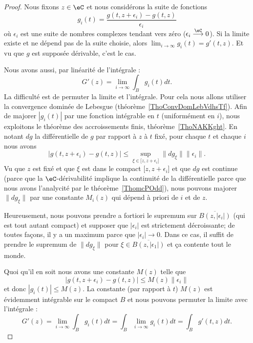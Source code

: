 \begin{proof}
	Nous fixons \( z\in \eC\) et nous considérons la suite de fonctions
	\begin{equation}
		g_i(t)=\frac{ g(t,z+\epsilon_i)-g(t,z) }{ \epsilon_i }
	\end{equation}
	où \( \epsilon_i\) est une suite de nombres complexes tendant vers zéro (\( \epsilon_i\stackrel{\eC}{\longrightarrow}0\)). Si la limite existe et ne dépend pas de la suite choisie, alors \( \lim_{i\to \infty} g_i(t)=g'(t,z)\). Et vu que \( g\) est supposée dérivable, c'est le cas.

	Nous avons aussi, par linéarité de l'intégrale :
	\begin{equation}
		G'(z)=\lim_{i\to \infty} \int_B g_i(t)dt.
	\end{equation}
	La difficulté est de permuter la limite et l'intégrale. Pour cela nous allons utiliser la convergence dominée de Lebesgue (théorème~\ref{ThoConvDomLebVdhsTf}). Afin de majorer \( | g_i(t) |\) par une fonction intégrable en \( t\) (uniformément en \( i\)), nous exploitons le théorème des accroissements finis, théorème~\ref{ThoNAKKght}. En notant \( dg\) la différentielle de \( g\) par rapport à \( z\) à \( t\) fixé, pour chaque \( t\) et chaque \( i\) nous avons
	\begin{equation}
		| g(t,z+\epsilon_i)-g(t,z) |\leq \sup_{\xi\in\mathopen[ z , z+\epsilon_i \mathclose]}\| dg_{\xi} \|\| \epsilon_i \|.
	\end{equation}
	Vu que \( z\) est fixé et que \( \xi\) est dans le compact \( \mathopen[ z , z+\epsilon_i \mathclose]\) et que \( dg\) est continue (parce que la \( \eC\)-dérivabilité implique la continuité de la différentielle parce que nous avons l'analycité par le théorème~\ref{ThomcPOdd}), nous pouvons majorer \( \| dg_{\xi} \|\) par une constante \( M_i(z)\) qui dépend à priori de \( i\) et de \( z\).

	Heureusement, nous pouvons prendre a fortiori le supremum sur \( \overline{ B(z,|\epsilon_i|) }\) (qui est tout autant compact) et supposer que \( | \epsilon_i |\) est strictement décroissante; de toutes façons, il y a un maximum parce que \( | \epsilon_i |\to 0\). Dans ce cas, il suffit de prendre le supremum de \( \| dg_{\xi} \|\) pour \( \xi\in \overline{ B(z,| \epsilon_1 |) }\) et ça contente tout le monde.

	Quoi qu'il en soit nous avons une constante \( M(z)\) telle que
	\begin{equation}
		| g(t,z+\epsilon_i)-g(t,z) |\leq M(z)\| \epsilon_i \|
	\end{equation}
	et donc \( | g_i(t) |\leq M(z)\). La constante (par rapport à \( t\)) \( M(z)\) est évidemment intégrable sur le compact \( B\) et nous pouvons permuter la limite avec l'intégrale :
	\begin{equation}
		G'(z)=\lim_{i\to \infty} \int_Bg_i(t)dt=\int_B\lim_{i\to \infty} g_i(t)dt=\int_Bg'(t,z)dt.
	\end{equation}
\end{proof}

